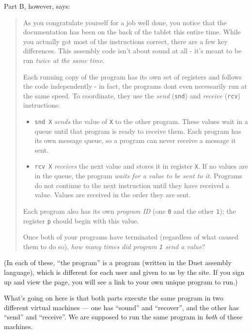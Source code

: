 \documentclass[]{article}
\begin{document}
Part B, however, says:

\begin{quote}
As you congratulate yourself for a job well done, you notice that the
documentation has been on the back of the tablet this entire time. While you
actually got most of the instructions correct, there are a few key differences.
This assembly code isn't about sound at all - it's meant to be run \emph{twice
at the same time}.

Each running copy of the program has its own set of registers and follows the
code independently - in fact, the programs don\textquotesingle t even
necessarily run at the same speed. To coordinate, they use the \emph{send}
(\texttt{snd}) and \emph{receive} (\texttt{rcv}) instructions:

\begin{itemize}
\tightlist
\item
  \texttt{snd\ X} \emph{sends} the value of \texttt{X} to the other program.
  These values wait in a queue until that program is ready to receive them. Each
  program has its own message queue, so a program can never receive a message it
  sent.
\item
  \texttt{rcv\ X} \emph{receives} the next value and stores it in register
  \texttt{X}. If no values are in the queue, the program \emph{waits for a value
  to be sent to it}. Programs do not continue to the next instruction until they
  have received a value. Values are received in the order they are sent.
\end{itemize}

Each program also has its own \emph{program ID} (one \texttt{0} and the other
\texttt{1}); the register \texttt{p} should begin with this value.

Once both of your programs have terminated (regardless of what caused them to do
so), \emph{how many times did program \texttt{1} send a value}?
\end{quote}

(In each of these, ``the program'' is a program (written in the Duet assembly
language), which is different for each user and given to us by the site. If you
sign up and view the page, you will see a link to your own unique program to
run.)

What's going on here is that both parts execute the same program in two
different virtual machines --- one has ``sound'' and ``recover'', and the other
has ``send'' and ``receive''. We are supposed to run the same program in
\emph{both} of these machines.
\end{document}
